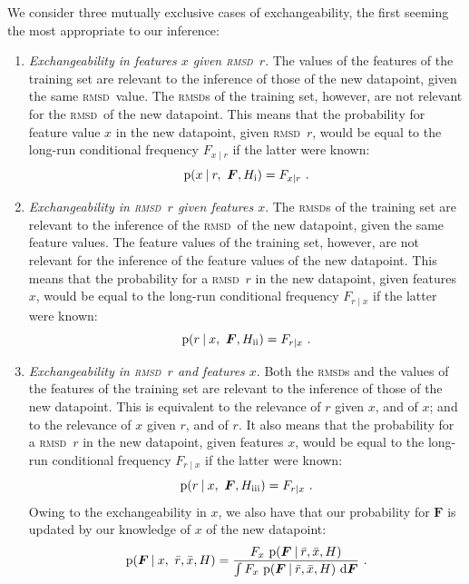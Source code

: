 \documentclass[\ifafour a4paper,12pt,\else a5paper,10pt,\fi%
onecolumn,oneside,article,%
british%
]{memoir}
\makeatletter
\theoremstyle{remark}
\theoremstyle{innote}
\newcommand*{\di}{\mathrm{d}}%
\newcommand*{\p}{\mathrm{p}}%
\renewcommand*{\|}[1][]{\nonscript\:#1\vert\nonscript\:\mathopen{}}
\renewcommand*{\=}{\TextOrMath\texteq\eq}
\newcommand*{\sect}{\S}%
\newcommand*{\wrench}{{\fontencoding{U}\fontfamily{fontawesomethree}\selectfont\symbol{114}}}
\newcommand{\mynote}[1]{ {\color{notecolour}#1}}
\newcommand*{\q}{}%
\DeclareRobustCommand*{\q}{%
  \mathord{\mathpalette\bigcdot@{}}%
}
\newcommand*{\bigcdot@scalefactor}{0.7}
\newcommand*{\bigcdot@widthfactor}{1.5}
\newcommand*{\bigcdot@}[2]{%
  \sbox0{$#1\vcenter{}$}%
  \sbox2{$#1\cdot\m@th$}%
  \hbox to \bigcdot@widthfactor\wd2{%
    \hfil
    \raise\ht0\hbox{%
      \scalebox{\bigcdot@scalefactor}{%
        \lower\ht0\hbox{$#1\bullet\m@th$}%
      }%
    }%
    \hfil
  }%
}
\newcommand*{\rmsd}{\textsc{rmsd}}
\newcommand*{\ro}{r}
\newcommand*{\xo}{x}
\newcommand*{\rd}{\bar{r}}
\newcommand*{\xd}{\bar{x}}
\newcommand*{\yF}{\bm{F}}
\makeatother
\begin{document}
We consider three mutually exclusive cases of exchangeability, the first
seeming the most appropriate to our inference:
\begin{enumerate}[label=\roman*.]
\item\label{item:exch_xr}\emph{Exchangeability in features $x$ given \rmsd\
    $r$}. The values of the features of the training set are relevant to
  the inference of those of the new datapoint, given the same \rmsd\ value.
  The \rmsd s of the training set, however, are not relevant for the \rmsd\
  of the new datapoint. This means that the probability for feature value
  $\xo$ in the new datapoint, given \rmsd\ $\ro$, would be equal to the
  long-run conditional frequency $F_{\xo\mid\ro}$ if the latter were known:
  \begin{equation}
    \label{eq:p_xr_F}
    \p(\xo \| \ro,\ \yF, H_{\textrm{i}}) = F_{\xo\mid\ro} \ .
  \end{equation}

\item\label{item:exch_rx}\emph{Exchangeability in \rmsd\ $r$ given features
    $x$}. The \rmsd s of the training set are relevant to the inference of
  the \rmsd\ of the new datapoint, given the same feature values. The
  feature values of the training set, however, are not relevant for the
  inference of the feature values of the new datapoint. This means that the
  probability for a \rmsd\ $\ro$ in the new datapoint, given features
  $\xo$, would be equal to the long-run conditional frequency
  $F_{\ro\mid\xo}$ if the latter were known:
  \begin{equation}
    \label{eq:p_rx_F}
    \p(\ro \| \xo,\ \yF, H_{\textrm{ii}}) = F_{\ro\mid\xo} \ .
  \end{equation}

\item\label{item:exch_full}\emph{Exchangeability in \rmsd\ $r$ and features
    $x$}. Both the \rmsd s and the values of the features of the training
  set are relevant to the inference of those of the new datapoint. This is
  equivalent to the relevance of $r$ given $x$, and of $x$; and to the
  relevance of $x$ given $r$, and of $r$. It also means that the
  probability for a \rmsd\ $\ro$ in the new datapoint, given features
  $\xo$, would be equal to the long-run conditional frequency
  $F_{\ro\mid\xo}$ if the latter were known:
  \begin{equation}
    \label{eq:p_full_F}
    \p(\ro \| \xo,\ \yF, H_{\textrm{iii}}) = F_{\ro\mid\xo} \ .
  \end{equation}
  Owing to the exchangeability in $x$, we also have that our probability
  for $\yF$ is updated by our knowledge of $\xo$ of the new datapoint:
  \begin{equation}
    \label{eq:F_update_xo}
    \p(\yF \| \xo,\ \rd, \xd, H) =
    \frac{F_{\q\xo}\ \p(\yF \| \rd, \xd, H)}{
    \int F_{\q\xo}\ \p(\yF \| \rd, \xd, H)\ \di\yF} \ .
  \end{equation}
\end{enumerate}
\end{document}
